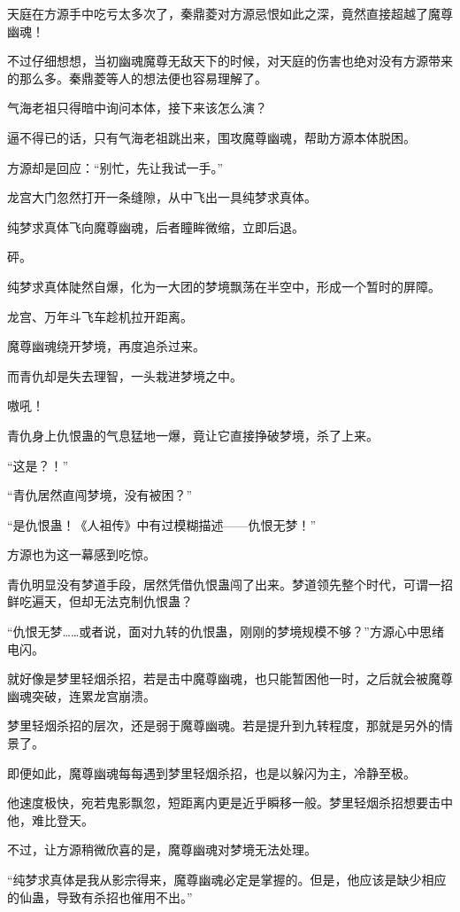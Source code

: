 \begin{this_body}
天庭在方源手中吃亏太多次了，秦鼎菱对方源忌恨如此之深，竟然直接超越了魔尊幽魂！

不过仔细想想，当初幽魂魔尊无敌天下的时候，对天庭的伤害也绝对没有方源带来的那么多。秦鼎菱等人的想法便也容易理解了。

气海老祖只得暗中询问本体，接下来该怎么演？

逼不得已的话，只有气海老祖跳出来，围攻魔尊幽魂，帮助方源本体脱困。

方源却是回应：“别忙，先让我试一手。”

龙宫大门忽然打开一条缝隙，从中飞出一具纯梦求真体。

纯梦求真体飞向魔尊幽魂，后者瞳眸微缩，立即后退。

砰。

纯梦求真体陡然自爆，化为一大团的梦境飘荡在半空中，形成一个暂时的屏障。

龙宫、万年斗飞车趁机拉开距离。

魔尊幽魂绕开梦境，再度追杀过来。

而青仇却是失去理智，一头栽进梦境之中。

嗷吼！

青仇身上仇恨蛊的气息猛地一爆，竟让它直接挣破梦境，杀了上来。

“这是？！”

“青仇居然直闯梦境，没有被困？”

“是仇恨蛊！《人祖传》中有过模糊描述——仇恨无梦！”

方源也为这一幕感到吃惊。

青仇明显没有梦道手段，居然凭借仇恨蛊闯了出来。梦道领先整个时代，可谓一招鲜吃遍天，但却无法克制仇恨蛊？

“仇恨无梦……或者说，面对九转的仇恨蛊，刚刚的梦境规模不够？”方源心中思绪电闪。

就好像是梦里轻烟杀招，若是击中魔尊幽魂，也只能暂困他一时，之后就会被魔尊幽魂突破，连累龙宫崩溃。

梦里轻烟杀招的层次，还是弱于魔尊幽魂。若是提升到九转程度，那就是另外的情景了。

即便如此，魔尊幽魂每每遇到梦里轻烟杀招，也是以躲闪为主，冷静至极。

他速度极快，宛若鬼影飘忽，短距离内更是近乎瞬移一般。梦里轻烟杀招想要击中他，难比登天。

不过，让方源稍微欣喜的是，魔尊幽魂对梦境无法处理。

“纯梦求真体是我从影宗得来，魔尊幽魂必定是掌握的。但是，他应该是缺少相应的仙蛊，导致有杀招也催用不出。”


\end{this_body}
